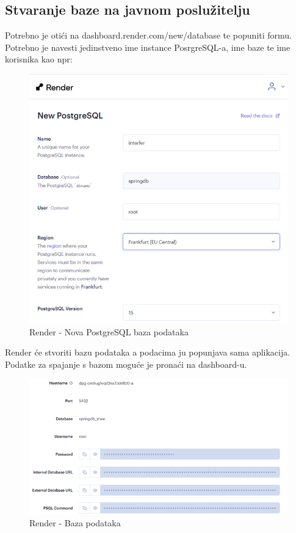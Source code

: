 \subsection{Stvaranje baze na javnom poslužitelju}

Potrebno je otići na dashboard.render.com/new/database te popuniti formu. 
Potrebno je navesti jedinstveno ime instance PosrgreSQL-a, ime baze te ime 
korisnika kao npr:

\begin{figure}[H]
	\includegraphics[scale=0.4]{slike/render_db.png}
	\centering
	\caption{Render - Nova PostgreSQL baza podataka}
	\label{fig:render_db1}
\end{figure}

Render će stvoriti bazu podataka a podacima ju popunjava sama aplikacija. 
Podatke za spajanje s bazom moguće je pronaći na dashboard-u.

\begin{figure}[H]
	\includegraphics[scale=0.4]{slike/render_db1.png}
	\centering
	\caption{Render - Baza podataka}
	\label{fig:render_db2}
\end{figure}


